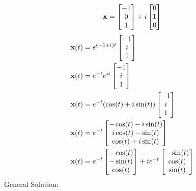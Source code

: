 \documentclass{article}
\begin{document}
\begin{equation*}
	\mathbf{x} = \begin{bmatrix} -1 \\ 0 \\ 1 \end{bmatrix} + i\begin{bmatrix} 0 \\ 1 \\ 0 \end{bmatrix}
\end{equation*}
\begin{align*}
	\mathbf{x}(t) & = e^{(-1 + i)t} \begin{bmatrix} -1 \\ i \\ 1 \end{bmatrix} \\
	\mathbf{x}(t) & = e^{-t}e^{it} \begin{bmatrix} -1 \\ i \\ 1 \end{bmatrix} \\
	\mathbf{x}(t) & = e^{-t}(\cos(t) + i\sin(t)) \begin{bmatrix} -1 \\ i \\ 1 \end{bmatrix} \\
	\mathbf{x}(t) & = e^{-t}
		\begin{bmatrix}
			-\cos(t) - i\sin(t) \\
			i\cos(t) - \sin(t) \\
			\cos(t) + i\sin(t)
		\end{bmatrix} \\
	\mathbf{x}(t) & = e^{-t}
		\begin{bmatrix}
			-\cos(t) \\
			-\sin(t) \\
			\cos(t)
		\end{bmatrix} +
		ie^{-t} \begin{bmatrix}
			-\sin(t) \\
			\cos(t) \\
			\sin(t)
		\end{bmatrix}
\end{align*}
General Solution:
\end{document}
